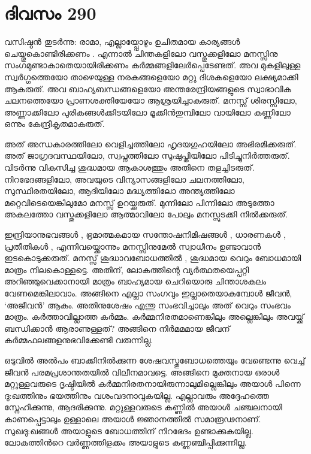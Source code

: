 \section{ദിവസം 290}


വസിഷ്ഠന്‍ തുടര്‍ന്നു: രാമാ, എല്ലായ്പ്പോഴും ഉചിതമായ കാര്യങ്ങള്‍ ചെയ്തുകൊണ്ടിരിക്കണം . എന്നാല്‍ ചിന്തകളിലോ വസ്തുക്കളിലോ മനസ്സിനു സംഗമുണ്ടാകാതെയായിരിക്കണം കര്‍മ്മങ്ങളിലേര്‍പ്പെടേണ്ടത്. അവ മുകളിലുള്ള  സ്വര്‍ഗ്ഗത്തെയോ താഴെയുള്ള നരകങ്ങളെയോ മറ്റു ദിശകളെയോ ലക്ഷ്യമാക്കി ആകരുത്. അവ ബാഹ്യബന്ധങ്ങളെയോ അന്തരേന്ദ്രിയങ്ങളുടെ സ്വാഭാവിക ചലനത്തെയോ പ്രാണശക്തിയേയോ ആശ്രയിച്ചാകരുത്. മനസ്സ് ശിരസ്സിലോ, അണ്ണാക്കിലോ പുരികങ്ങള്‍ക്കിടയിലോ മൂക്കിന്‍തുമ്പിലോ വായിലോ കണ്ണിലോ ഒന്നും കേന്ദ്രീകൃതമാകരുത്.       

അത് അന്ധകാരത്തിലോ വെളിച്ചത്തിലോ ഹൃദയഗുഹയിലോ അഭിരമിക്കരുത്. അത് ജാഗ്രദവസ്ഥയിലോ, സ്വപ്നത്തിലോ സുഷുപ്തിയിലോ പിടിച്ചുനിര്‍ത്തരുത്. വിടര്‍ന്നു വികസിച്ച ശുദ്ധമായ ആകാശത്തും അതിനെ തളച്ചിടരുത്. നിറഭേദങ്ങളിലോ, അവയുടെ വിന്യാസങ്ങളിലോ ചലനത്തിലോ, സുസ്ഥിരതയിലോ, ആദിയിലോ മദ്ധ്യത്തിലോ അന്ത്യത്തിലോ മറ്റെവിടെയെങ്കിലുമോ മനസ്സ് ഉറയ്ക്കരുത്. മുന്നിലോ പിന്നിലോ അടുത്തോ അകലത്തോ വസ്തുക്കളിലോ ആത്മാവിലോ പോലും മനസ്സുടക്കി നില്‍ക്കരുത്.

ഇന്ദ്രിയാനുഭവങ്ങള്‍ , ഭ്രമാത്മകമായ സന്തോഷനിമിഷങ്ങള്‍ , ധാരണകള്‍ , പ്രതീതികള്‍ , എന്നിവയ്ക്കൊന്നും മനസ്സിനുമേല്‍ സ്വാധീനം ഉണ്ടാവാന്‍ ഇടകൊടുക്കരുത്. മനസ്സ് ശുദ്ധാവബോധത്തില്‍ , ശുദ്ധമായ വെറും ബോധമായി മാത്രം നിലകൊള്ളട്ടെ. അതിന്, ലോകത്തിന്റെ വ്യര്‍ത്ഥതയെപ്പറ്റി അറിഞ്ഞുവെക്കാനായി മാത്രം ബാഹ്യമായ ചെറിയൊരു ചിന്താശകലം വേണമെങ്കിലാവാം. അങ്ങിനെ എല്ലാ സംഗവും ഇല്ലാതെയാകുമ്പോള്‍ ജീവന്‍, ‘അജീവന്‍’ ആകും. അതിനുശേഷം എന്തു സംഭവിച്ചാലും അത് വെറും സംഭവം മാത്രം. കര്‍ത്താവില്ലാത്ത കര്‍മ്മം.  കര്‍മ്മനിരതമാണെങ്കിലും അല്ലെങ്കിലും അവയ്ക്ക് ബന്ധിക്കാന്‍ ആരാണുള്ളത്? അങ്ങിനെ നിര്‍മമമായ ജീവന് കര്‍മ്മഫലങ്ങളനുഭവിക്കേണ്ടി വരുന്നില്ല.  

ഒടുവില്‍ അല്‍പം ബാക്കിനില്‍ക്കുന്ന ശേഷവസ്തുബോധത്തെയും വേണ്ടെന്നു വെച്ച് ജീവന്‍ പരമപ്രശാന്തതയില്‍ വിലീനമാവട്ടെ. അങ്ങിനെ മുക്തനായ ഒരാള്‍ മറ്റുള്ളവരുടെ ദൃഷ്ടിയില്‍ കര്‍മ്മനിരതനായിരുന്നാലുമില്ലെങ്കിലും അയാള്‍ പിന്നെ ദു:ഖത്തിനും ഭയത്തിനും വശംവദനാവുകയില്ല. എല്ലാവരും അദ്ദേഹത്തെ സ്നേഹിക്കുന്നു, ആദരിക്കുന്നു. മറ്റുള്ളവരുടെ കണ്ണില്‍ അയാള്‍ ചഞ്ചലനായി കാണപ്പെട്ടാലും ഉള്ളാലെ അയാള്‍ ജ്ഞാനത്തില്‍ സമാരൂഢനാണ്. സുഖദു:ഖങ്ങള്‍ അയാളുടെ ബോധത്തിന് നിറഭേദം ഉണ്ടാക്കുകയില്ല. ലോകത്തിന്‍റെ വര്‍ണ്ണത്തിളക്കം അയാളുടെ കണ്ണഞ്ചിപ്പിക്കുന്നില്ല. 

